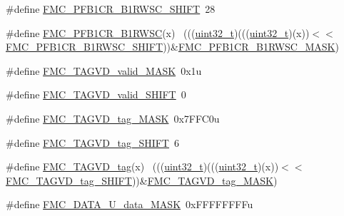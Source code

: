 \begin{DoxyCompactItemize}
\#define \hyperlink{group___f_m_c___register___masks_ga72daab1c5e2db3b1e521590edc2a153a}{F\+M\+C\+\_\+\+P\+F\+B1\+C\+R\+\_\+\+B1\+R\+W\+S\+C\+\_\+\+S\+H\+I\+FT}~28
\item 
\#define \hyperlink{group___f_m_c___register___masks_ga62a71a9c738bba11004689f982f84450}{F\+M\+C\+\_\+\+P\+F\+B1\+C\+R\+\_\+\+B1\+R\+W\+SC}(x)                                      ~(((\hyperlink{_p_e___types_8h_a33594304e786b158f3fb30289278f5af}{uint32\+\_\+t})(((\hyperlink{_p_e___types_8h_a33594304e786b158f3fb30289278f5af}{uint32\+\_\+t})(x))$<$$<$\hyperlink{group___f_m_c___register___masks_ga72daab1c5e2db3b1e521590edc2a153a}{F\+M\+C\+\_\+\+P\+F\+B1\+C\+R\+\_\+\+B1\+R\+W\+S\+C\+\_\+\+S\+H\+I\+FT}))\&\hyperlink{group___f_m_c___register___masks_ga3ab917a9071f70118eaabd80f2ec08e4}{F\+M\+C\+\_\+\+P\+F\+B1\+C\+R\+\_\+\+B1\+R\+W\+S\+C\+\_\+\+M\+A\+SK})
\item 
\#define \hyperlink{group___f_m_c___register___masks_ga4cb93c0b6eac8e4c1d39d248ad8bf143}{F\+M\+C\+\_\+\+T\+A\+G\+V\+D\+\_\+valid\+\_\+\+M\+A\+SK}~0x1u
\item 
\#define \hyperlink{group___f_m_c___register___masks_gad6afeb0885f0d5b21e78f96470e8843a}{F\+M\+C\+\_\+\+T\+A\+G\+V\+D\+\_\+valid\+\_\+\+S\+H\+I\+FT}~0
\item 
\#define \hyperlink{group___f_m_c___register___masks_ga84d9df5059d93e9d8c206114912e728f}{F\+M\+C\+\_\+\+T\+A\+G\+V\+D\+\_\+tag\+\_\+\+M\+A\+SK}~0x7\+F\+F\+C0u
\item 
\#define \hyperlink{group___f_m_c___register___masks_gae47539ff4ee56bb429932a28a2a4551b}{F\+M\+C\+\_\+\+T\+A\+G\+V\+D\+\_\+tag\+\_\+\+S\+H\+I\+FT}~6
\item 
\#define \hyperlink{group___f_m_c___register___masks_gabbc7c41cb4e1ae572c110788068f157a}{F\+M\+C\+\_\+\+T\+A\+G\+V\+D\+\_\+tag}(x)                                              ~(((\hyperlink{_p_e___types_8h_a33594304e786b158f3fb30289278f5af}{uint32\+\_\+t})(((\hyperlink{_p_e___types_8h_a33594304e786b158f3fb30289278f5af}{uint32\+\_\+t})(x))$<$$<$\hyperlink{group___f_m_c___register___masks_gae47539ff4ee56bb429932a28a2a4551b}{F\+M\+C\+\_\+\+T\+A\+G\+V\+D\+\_\+tag\+\_\+\+S\+H\+I\+FT}))\&\hyperlink{group___f_m_c___register___masks_ga84d9df5059d93e9d8c206114912e728f}{F\+M\+C\+\_\+\+T\+A\+G\+V\+D\+\_\+tag\+\_\+\+M\+A\+SK})
\item 
\#define \hyperlink{group___f_m_c___register___masks_gae43292c4f0149b2bc25d115b7f5a6ee9}{F\+M\+C\+\_\+\+D\+A\+T\+A\+\_\+\+U\+\_\+data\+\_\+\+M\+A\+SK}~0x\+F\+F\+F\+F\+F\+F\+F\+Fu
\item 

\end{DoxyCompactItemize}
